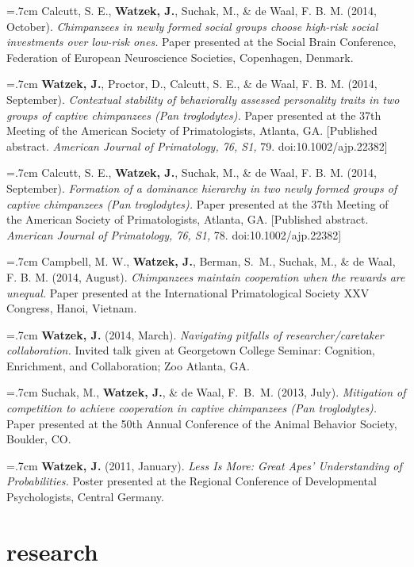 \documentclass[]{friggeri-cv}
\begin{document}
\hangindent=.7cm Calcutt, S. E., \textbf{Watzek, J.}, Suchak, M., \& de Waal, F. B. M. (2014, October). \emph{Chimpanzees in newly formed social groups choose high-risk social investments over low-risk ones.} Paper presented at the Social Brain Conference, Federation of European Neuroscience Societies, Copenhagen, Denmark.

\hangindent=.7cm \textbf{Watzek, J.}, Proctor, D., Calcutt, S. E., \& de Waal, F. B. M. (2014, September). \emph{Contextual stability of behaviorally assessed personality traits in two groups of captive chimpanzees (\textit{Pan troglodytes}).} Paper presented at the 37th Meeting of the American Society of Primatologists, Atlanta, GA. [Published abstract. \emph{American Journal of Primatology, 76, S1,} 79. doi:10.1002/ajp.22382]

\hangindent=.7cm Calcutt, S. E., \textbf{Watzek, J.}, Suchak, M., \& de Waal, F. B. M. (2014, September). \emph{Formation of a dominance hierarchy in two newly formed groups of captive chimpanzees (\textit{Pan troglodytes}).} Paper presented at the 37th Meeting of the American Society of Primatologists, Atlanta, GA. [Published abstract. \emph{American Journal of Primatology, 76, S1,} 78. doi:10.1002/ajp.22382]

\hangindent=.7cm Campbell, M. W., \textbf{Watzek, J.}, Berman, S.~M., Suchak, M., \& de Waal, F. B. M. (2014, August). \emph{Chimpanzees maintain cooperation when the rewards are unequal.} Paper presented at the International Primatological Society XXV Congress, Hanoi, Vietnam.

\hangindent=.7cm \textbf{Watzek, J.} (2014, March). \emph{Navigating pitfalls of researcher/caretaker collaboration.} Invited talk given at Georgetown College Seminar: Cognition, Enrichment, and Collaboration; Zoo Atlanta, GA.

\hangindent=.7cm Suchak, M., \textbf{Watzek, J.}, \& de Waal, F.~B.~M. (2013, July). \emph{Mitigation of competition to achieve cooperation in captive chimpanzees \emph{(Pan troglodytes)}.} Paper presented at the 50th Annual Conference of the Animal Behavior Society, Boulder, CO.

\hangindent=.7cm \textbf{Watzek, J.} (2011, January). \emph{Less Is More: Great Apes' Understanding of Probabilities.} Poster presented at the Regional Conference of Developmental Psychologists, Central Germany.\\[-.1cm]

\thispagestyle{fancy}

\section{research}
\end{document}
